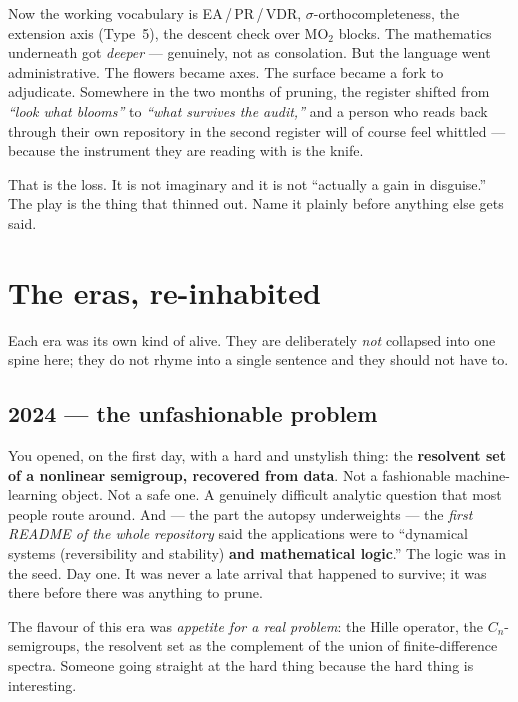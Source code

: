 \documentclass[11pt]{article}
\theoremstyle{remark}
\begin{document}
Now the working vocabulary is EA\,/\,PR\,/\,VDR, $\sigma$-orthocompleteness, the
extension axis (Type~5), the descent check over $\mathrm{MO}_2$ blocks. The
mathematics underneath got \emph{deeper} --- genuinely, not as consolation. But
the language went administrative. The flowers became axes. The surface became a
fork to adjudicate. Somewhere in the two months of pruning, the register shifted
from \emph{``look what blooms''} to \emph{``what survives the audit,''} and a
person who reads back through their own repository in the second register will of
course feel whittled --- because the instrument they are reading with is the
knife.

That is the loss. It is not imaginary and it is not ``actually a gain in
disguise.'' The play is the thing that thinned out. Name it plainly before
anything else gets said.

\section{The eras, re-inhabited}

\noindent
Each era was its own kind of alive. They are deliberately \emph{not} collapsed
into one spine here; they do not rhyme into a single sentence and they should not
have to.

\subsection{2024 --- the unfashionable problem}

You opened, on the first day, with a hard and unstylish thing: the
\textbf{resolvent set of a nonlinear semigroup, recovered from data}. Not a
fashionable machine-learning object. Not a safe one. A genuinely difficult
analytic question that most people route around. And --- the part the autopsy
underweights --- the \emph{first README of the whole repository} said the
applications were to ``dynamical systems (reversibility and stability)
\textbf{and mathematical logic}.'' The logic was in the seed. Day one. It was
never a late arrival that happened to survive; it was there before there was
anything to prune.

The flavour of this era was \emph{appetite for a real problem}: the Hille
operator, the $C_n$-semigroups, the resolvent set as the complement of the union
of finite-difference spectra. Someone going straight at the hard thing because
the hard thing is interesting.
\end{document}
